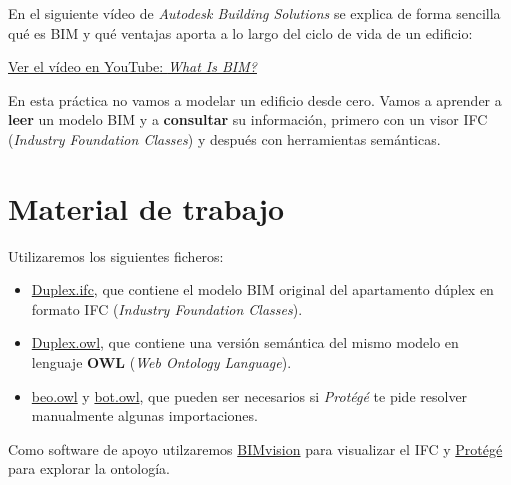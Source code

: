 \documentclass[
  spanish,
  11pt,
  a4paper,
  DIV=11,
  numbers=noendperiod]{scrartcl}
\providecommand{\tightlist}{\setlength{\itemsep}{0pt}\setlength{\parskip}{0pt}}
\begin{document}
En el siguiente vídeo de \emph{Autodesk Building Solutions} se explica
de forma sencilla qué es BIM y qué ventajas aporta a lo largo del ciclo
de vida de un edificio:

\href{https://www.youtube.com/watch?v=suNadRnHy-U}{Ver el vídeo en
YouTube: \emph{What Is BIM?}}


\begin{tcolorbox}[enhanced jigsaw, leftrule=.75mm, breakable, colback=white, colbacktitle=quarto-callout-note-color!10!white, bottomrule=.15mm, left=2mm, bottomtitle=1mm, coltitle=black, toprule=.15mm, toptitle=1mm, rightrule=.15mm, opacityback=0, title=\textcolor{quarto-callout-note-color}{\faInfo}\hspace{0.5em}{Idea clave}, arc=.35mm, titlerule=0mm, colframe=quarto-callout-note-color-frame, opacitybacktitle=0.6]

En esta práctica no vamos a modelar un edificio desde cero. Vamos a
aprender a \textbf{leer} un modelo BIM y a \textbf{consultar} su
información, primero con un visor IFC (\emph{Industry Foundation
Classes}) y después con herramientas semánticas.

\end{tcolorbox}

\section{Material de trabajo}\label{material-de-trabajo}

Utilizaremos los siguientes ficheros:

\begin{itemize}
\tightlist
\item
  \href{../resources/practica8/files/Duplex.ifc}{Duplex.ifc}, que
  contiene el modelo BIM original del apartamento dúplex en formato IFC
  (\emph{Industry Foundation Classes}).
\item
  \href{../resources/practica8/files/Duplex.owl}{Duplex.owl}, que
  contiene una versión semántica del mismo modelo en lenguaje
  \textbf{OWL} (\emph{Web Ontology Language}).
\item
  \href{../resources/practica8/files/beo.owl}{beo.owl} y
  \href{../resources/practica8/files/bot.owl}{bot.owl}, que pueden ser
  necesarios si \emph{Protégé} te pide resolver manualmente algunas
  importaciones.
\end{itemize}

Como software de apoyo utilzaremos
\href{https://bimvision.eu}{BIMvision} para visualizar el IFC y
\href{http://protege.stanford.edu}{Protégé} para explorar la ontología.
\end{document}
